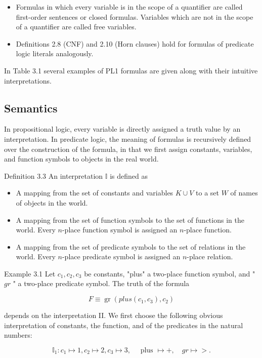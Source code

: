 \documentclass[10pt]{book}
\begin{document}
\begin{itemize}
  \item Formulas in which every variable is in the scope of a quantifier are called first-order sentences or closed formulas. Variables which are not in the scope of a quantifier are called free variables.
  \item Definitions 2.8 (CNF) and 2.10 (Horn clauses) hold for formulas of predicate logic literals analogously.
\end{itemize}


In Table 3.1 several examples of PL1 formulas are given along with their intuitive interpretations.

\subsection*{Semantics}
In propositional logic, every variable is directly assigned a truth value by an interpretation. In predicate logic, the meaning of formulas is recursively defined over the construction of the formula, in that we first assign constants, variables, and function symbols to objects in the real world.

Definition 3.3 An interpretation $\mathbb{I}$ is defined as

\begin{itemize}
  \item A mapping from the set of constants and variables $K \cup V$ to a set $W$ of names of objects in the world.
  \item A mapping from the set of function symbols to the set of functions in the world. Every $n$-place function symbol is assigned an $n$-place function.
  \item A mapping from the set of predicate symbols to the set of relations in the world. Every $n$-place predicate symbol is assigned an $n$-place relation.
\end{itemize}

Example 3.1 Let $c_{1}, c_{2}, c_{3}$ be constants, "plus" a two-place function symbol, and " $g r$ " a two-place predicate symbol. The truth of the formula

$$
F \equiv \operatorname{gr}\left(p l u s\left(c_{1}, c_{3}\right), c_{2}\right)
$$

depends on the interpretation II. We first choose the following obvious interpretation of constants, the function, and of the predicates in the natural numbers:

$$
\mathbb{I}_{1}: c_{1} \mapsto 1, c_{2} \mapsto 2, c_{3} \mapsto 3, \quad \text { plus } \mapsto+, \quad g r \mapsto>.
$$
\end{document}
